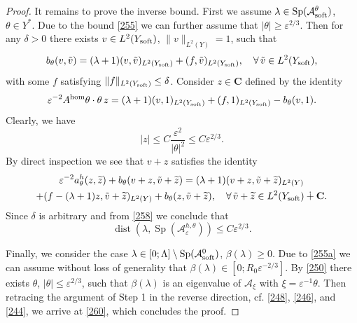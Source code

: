 \documentclass[11pt]{article}
\newcommand\e {\varepsilon}
\newcommand\soft{{\rm soft}}
\def\C{\mathbf {C}}
\def\AA{\mathcal{A}}
\def\l{\lambda}
\def\hom{{\rm hom}}
\DeclareMathOperator{\Sp}{Sp}
\newcommand\dist{\operatorname{dist}}
\theoremstyle{remark}
\begin{document}
\begin{proof}
 It remains to prove the inverse bound. First we assume  $\l\in\Sp(\AA_\soft^\theta)$, $\theta\in  Y^*$. Due to the bound \eqref{255} we can further assume that $|\theta |\geq \e^{2/3}$. Then for any $\delta >0$  there exists $v  \in L^2(Y_\soft) $, $\|v  \|_{L^2(Y)}=1$, such that
 	\begin{equation*}%
		 b_\theta(v , \tilde v) =  (\l +1)(v ,\tilde v )_{L^2(Y_\soft)} + (f,\tilde v  )_{L^2(Y_\soft)}, \quad \forall\, \tilde v \in L^2(Y_\soft),
	\end{equation*}
  with some $f$ satisfying  $\| f\|_{L^2(Y_\soft)}\leq \delta$. Consider $z \in \mathbf C$ defined by the identity
  \begin{equation*}
     \e^{-2}  A^\hom \theta \cdot \theta \, z = (\l +1)(v ,1 )_{L^2(Y_\soft)} + (f,1 )_{L^2(Y_\soft)} - b_\theta(v , 1).
  \end{equation*}
  Clearly, we have
  \begin{equation}\label{258}
      |z| \leq C \frac{\e^2}{|\theta|^2} \leq C \e^{2/3}.
  \end{equation}
  By direct inspection we see that $v+z$ satisfies the identity
  	\begin{multline*}%
  	    	\e^{-2} a_\theta^h(z, \widetilde z) + b_\theta(v + z, \tilde v+ \widetilde z) =  (\l +1)(v + z,\tilde v + \widetilde z)_{L^2(Y)}
        \\
        + (f - (\l +1) z,\tilde v  + \widetilde z)_{L^2(Y)} + b_\theta( z, \tilde v+ \widetilde z) , \quad \forall\, \tilde v+\widetilde z \in L^2(Y_\soft) \dotplus \C.
  	\end{multline*}
	Since $\delta$ is arbitrary and from \eqref{258} we conclude that
 \begin{equation}\label{260}
    \dist( \l, \Sp (\AA_\e^{h,\theta}) ) \leq C \e^{2/3}.
 \end{equation}

Finally, we consider the case $\l\in [0;\Lambda]\setminus \Sp(\AA_\soft^0)$, $\beta(\l) \geq 0$. Due to \eqref{255a} we can assume without loss of generality that $\beta(\l) \in [0;R_0 \e^{-2/3}] $. By \eqref{250} there exists $\theta$, $|\theta|\leq \e^{2/3}$, such that  $\beta(\l)$ is an eigenvalue of $\AA_\xi$ with $\xi = \e^{-1}\theta$. Then retracing the argument of Step 1 in the reverse direction, cf. \eqref{248}, \eqref{246}, and  \eqref{244}, we arrive at \eqref{260}, which concludes the proof.

	
\end{proof}
\end{document}
